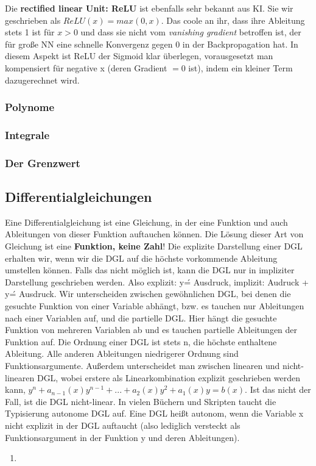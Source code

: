 \documentclass{scrreprt}
\begin{document}
Die \textbf{rectified linear Unit: ReLU} ist ebenfalls sehr bekannt aus KI. Sie wir geschrieben als $ReLU(x)=max(0,x)$. Das coole an ihr, dass ihre Ableitung stets 1 ist für $x>0$ und dass sie nicht vom \textit{vanishing gradient} betroffen ist, der für große NN eine schnelle Konvergenz gegen 0 in der Backpropagation hat. In diesem Aspekt ist ReLU der Sigmoid klar überlegen, vorausgesetzt man kompensiert für negative x (deren Gradient $= 0$ ist), indem ein kleiner Term dazugerechnet wird.
\subsubsection{Polynome}\label{Polynome}
\subsubsection{Integrale}\label{Integrale}
\subsubsection{Der Grenzwert}\label{Der Grenzwert}
\subsection{Differentialgleichungen}\label{Differentialgleichung}
Eine Differentialgleichung ist eine Gleichung, in der eine Funktion und auch Ableitungen von dieser Funktion auftauchen können. Die Lösung dieser Art von Gleichung ist eine \textbf{Funktion, keine Zahl}! Die explizite Darstellung einer DGL erhalten wir, wenn wir die DGL auf die höchste vorkommende Ableitung umstellen können. Falls das nicht möglich ist, kann die DGL nur in impliziter Darstellung geschrieben werden. Also explizit: y\'= Ausdruck, implizit: Audruck + y\' = Ausdruck. Wir unterscheiden zwischen gewöhnlichen DGL, bei denen die gesuchte Funktion von einer Variable abhängt, bzw. es tauchen nur Ableitungen nach einer Variablen auf, und die partielle DGL. Hier hängt die gesuchte Funktion von mehreren Variablen ab und es tauchen partielle Ableitungen der Funktion auf. Die Ordnung einer DGL ist stets n, die höchste enthaltene Ableitung. Alle anderen Ableitungen niedrigerer Ordnung sind Funktionsargumente. Außerdem unterscheidet man zwischen linearen und nicht-linearen DGL, wobei erstere als Linearkombination explizit geschrieben werden kann, $y^n+a_{n-1}(x)y^{n-1}+...+a_2(x)y^2+a_1(x)y=b(x)$. Ist das nicht der Fall, ist die DGL nicht-linear.
In vielen Büchern und Skripten taucht die Typisierung autonome DGL auf. Eine DGL heißt autonom, wenn die Variable x nicht explizit in der DGL auftaucht (also lediglich versteckt als Funktionsargument in der Funktion y und deren Ableitungen).
\begin{enumerate}
    \item 
\end{enumerate}
\end{document}

